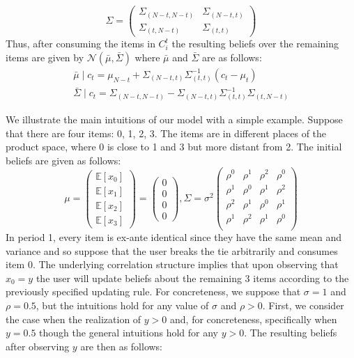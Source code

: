 \documentclass[format=acmsmall, review=false]{acmart}
\newcommand{\xhdr}[1]{\vspace{1mm} \noindent{\bf #1}}
\begin{document}
\[ \Sigma =  \left( \begin{array}{cc}
\Sigma_{(N-t, N-t)} & \Sigma_{(N-t,t)} \\
\Sigma_{(t,N-t)} & \Sigma_{(t,t)}
\end{array} \right)
\]
Thus, after consuming the items in $C_{i}^{t}$ the resulting beliefs over the remaining items are given by $\mathcal{N}(\bar{\mu}, \bar{\Sigma})$ where $\bar{\mu}$ and $\bar{\Sigma}$ are as follows:
\begin{align*}
\bar{\mu} \mid c_t = \mu_{N-t} + \Sigma_{(N-t,t)} \Sigma_{(t,t)}^{-1}(c_t - \mu_t) \\
\bar{\Sigma} \mid c_t = \Sigma_{(N-t,N-t)} - \Sigma_{(N-t,t)} \Sigma_{(t,t)}^{-1} \Sigma_{(t,N-t)}
\end{align*}

\xhdr{An Illustrative Example} We illustrate the main intuitions of our model with a simple example. Suppose that there are four items: 0, 1, 2, 3. The items are in different places of the product space, where 0 is close to 1 and 3 but more distant from 2. The initial beliefs are given as follows:
\[ \mu = \left (\begin{array}{c}
\mathbb{E}[x_0] \\
\mathbb{E}[x_1] \\
\mathbb{E}[x_2] \\
\mathbb{E}[x_3]
\end{array}  \right) = \left (\begin{array}{c}
0 \\
0\\
0 \\
0
\end{array}  \right), \Sigma =  \sigma^{2} \left( \begin{array}{cccc}
\rho^{0} & \rho^{1} & \rho^{2} & \rho^{0} \\
\rho^{1} & \rho^{0} & \rho^{1} & \rho^{2} \\
\rho^{2} & \rho^{1} & \rho^{0} & \rho^{1} \\
\rho^{1} & \rho^{2} & \rho^{1} & \rho^{0} \\
\end{array} \right)
\]
In period 1, every item is ex-ante identical since they have the same mean and variance and so suppose that the user breaks the tie arbitrarily and consumes item 0. The underlying correlation structure implies that upon observing that $x_0=y$ the user will update beliefs about the remaining 3 items according to the previously specified updating rule. For concreteness, we suppose that $\sigma = 1$ and $\rho = 0.5$, but the intuitions hold for any value of $\sigma$ and $\rho > 0$. First, we consider the case when the realization of $y > 0$ and, for concreteness, specifically when $y = 0.5$ though the general intuitions hold for any $y > 0$. The resulting beliefs after observing $y$ are then as follows:
\end{document}
